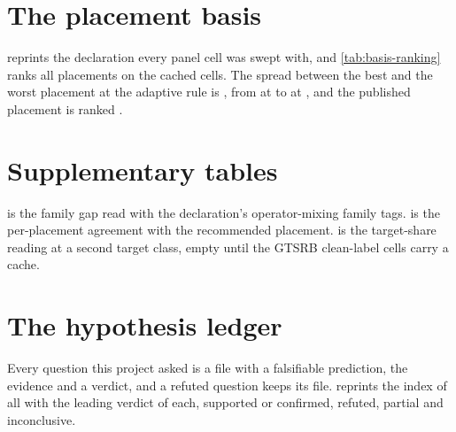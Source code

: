\documentclass[../main.tex]{subfiles}
\begin{document}
\section{The placement basis}
\label{app:basis}

 reprints the declaration every panel cell was swept with, and \cref{tab:basis-ranking} ranks all \BasisSize{} placements on the cached cells. The spread between the best and the worst placement at the adaptive rule is \BasisSpreadAdaptive{}, from \code{\BasisBestPlacement} at \BasisBestAurocAdaptive{} to \code{\BasisWorstPlacement} at \BasisWorstAurocAdaptive{}, and the published placement is ranked \BasisRankPublishedAdaptive{}.




\section{Supplementary tables}

 is the family gap read with the declaration's operator-mixing family tags.  is the per-placement agreement with the recommended placement.  is the target-share reading at a second target class, empty until the GTSRB clean-label cells carry a cache.





\section{The hypothesis ledger}
\label{app:hypotheses}

Every question this project asked is a file with a falsifiable prediction, the evidence and a verdict, and a refuted question keeps its file.  reprints the index of all \HypothesisCount{} with the leading verdict of each, \HypothesisSupported{} supported or confirmed, \HypothesisRefuted{} refuted, \HypothesisPartial{} partial and \HypothesisInconclusive{} inconclusive.


\end{document}
